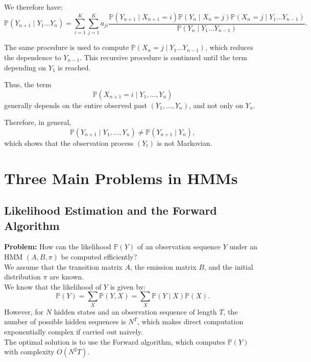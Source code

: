 \documentclass[11pt]{article}
\begin{document}
We therefore have: 
\[
\mathbb{P}(Y_{n+1}\mid Y_1 \dots Y_n ) = \sum_{i=1}^{K} \sum_{j=1}^K a_{ji} \frac{\mathbb{P}(Y_{n+1} \mid X_{n+1} = i) \mathbb{P}(Y_n \mid X_n=j) \mathbb{P}(X_n=j \mid Y_1 \dots Y_{n-1})}{\mathbb{P}(Y_n \mid Y_1 \dots Y_{n-1})}.
\]

The same procedure is used to compute $\mathbb{P}(X_n = j \mid Y_1 \dots Y_{n-1})$, which reduces the dependence to $Y_{n-1}$. This recursive procedure is continued until the term depending on $Y_1$ is reached.

Thus, the term
\[
\mathbb{P}(X_{n+1}=i \mid Y_1,\dots,Y_n)
\]
generally depends on the entire observed past $(Y_1,\dots,Y_n)$, and not only on $Y_n$.

Therefore, in general,
\[
\mathbb{P}(Y_{n+1} \mid Y_1,\dots,Y_n) \neq \mathbb{P}(Y_{n+1} \mid Y_n),
\]
which shows that the observation process $(Y_t)$ is not Markovian.

\newpage

\section{Three Main Problems in HMMs}


\subsection{Likelihood Estimation and the Forward Algorithm}

\textbf{Problem:}
How can the likelihood $\mathbb{P}(Y)$ of an observation sequence $Y$ under an HMM $(A, B, \pi)$ be computed efficiently? \\ 

We assume that the transition matrix $A$, the emission matrix $B$, and the initial distribution $\pi$ are known. \\ 

We know that the likelihood of $Y$ is given by:
\[
\mathbb{P}(Y) = \sum_{X}\mathbb{P}(Y,X) = \sum_{X}\mathbb{P}(Y \mid X)\mathbb{P}(X).
\]
However, for $N$ hidden states and an observation sequence of length $T$, the number of possible hidden sequences is $N^T$, which makes direct computation exponentially complex if carried out naively. \\ 
The optimal solution is to use the Forward algorithm, which computes $\mathbb{P}(Y)$ with complexity $O(N^2T)$. \\ 
\end{document}
